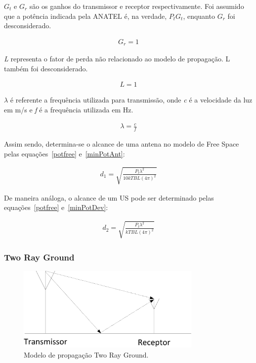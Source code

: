 \begin{math}G_t\end{math} e \begin{math}G_r\end{math} são os ganhos do transmissor e receptor respectivamente. Foi assumido que a potência indicada pela ANATEL é, na verdade, \begin{math}P_tG_t\end{math}, enquanto \begin{math}G_r\end{math} foi desconsiderado.

\begin{align}
  \label{ganho} G_r = 1
\end{align}

\textit{L} representa o fator de perda não relacionado ao modelo de propagação. L também foi desconsiderado.

\begin{align}
  \label{loss} L = 1
\end{align}

\begin{math}\lambda\end{math} é referente a frequência utilizada para transmissão, onde \textit{c} é a velocidade da luz em m/s e \textit{f} é a frequência utilizada em Hz.

\begin{align}
  \label{lambda}\lambda=\frac{c}{f}
\end{align}

Assim sendo, determina-se o alcance de uma antena no modelo de Free Space pelas equações~\ref{potfree} e~\ref{minPotAnt}:

\begin{align}
  \label{dFreeAnt} d_1 = \sqrt{\frac{P_t\lambda^{2}}{10kTBL(4\pi)^{2}}}
\end{align}

De maneira análoga, o alcance de um US pode ser determinado pelas equações~\ref{potfree} e~\ref{minPotDev}:

\begin{align}
  \label{dFreeDev} d_2 = \sqrt{\frac{P_t\lambda^{2}}{kTBL(4\pi)^{2}}}
\end{align}

\subsubsection{Two Ray Ground}

\begin{figure}[htb]
\centering
\includegraphics[width=0.8\textwidth]{figs/tworay}
\caption[Modelo de propagação Two Ray Ground.]
{Modelo de propagação Two Ray Ground.}
\label{fig:tworay}
\end{figure}

